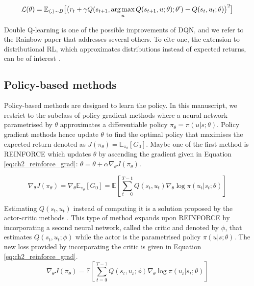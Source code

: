 \begin{equation}
    \label{eq:ch2_doubleQ}
    \mathcal{L}(\theta) = \mathbb{E}_{\langle . \rangle\sim B} \big[\big(r_{t} + \gamma Q(s_{t+1}, \operatorname*{arg\,max}_u Q(s_{t+1}, u;\theta) ; \theta')- Q(s_{t}, u_{t}; \theta)\big)^{2}\big]
\end{equation}

Double Q-learning is one of the possible improvements of DQN, and we refer to the Rainbow paper \citep{hessel2018rainbow} that addresses several others.
To cite one, the extension to distributional RL, which approximates distributions instead of expected returns, can be of interest \citep{bellemare2017distributional, THEATE2023199}. 

\subsection{Policy-based methods} \label{sec:ch2_policy_based_methods}
Policy-based methods are designed to learn the policy.
In this manuscript, we restrict to the subclass of policy gradient methods where a neural network parametrised by $\theta$ approximates a differentiable policy $\pi_\theta=\pi(u|s;\theta)$.
Policy gradient methods hence update $\theta$ to find the optimal policy that maximises the expected return denoted as  $J(\pi_\theta) = \mathbb{E}_{\pi_\theta}[G_0]$.
Maybe one of the first method is REINFORCE \citep{williams1992simple} which updates $\theta$  by ascending the gradient given in Equation \ref{eq:ch2_reinforce_grad}: $\theta = \theta + \alpha \nabla_\theta J(\pi_\theta)$.

\begin{equation}
\label{eq:ch2_reinforce_grad}
    \nabla_\theta J(\pi_\theta) = \nabla_\theta \mathbb{E}_{\pi_\theta}[G_0] = \mathbb{E}\left[\sum_{t=0}^{T-1} Q(s_t, u_t) \nabla_\theta \log \pi(u_t|s_t;\theta)\right]
\end{equation}

Estimating $Q(s_t, u_t)$ instead of computing it is a solution proposed by the actor-critic methods \citep{sutton1999policy,konda1999actor}.
This type of method expands upon REINFORCE by incorporating a second neural network, called the critic and denoted by $\phi$, that estimates $Q(s_t, u_t;\phi)$ while the actor is the parametrised policy $\pi(u|s;\theta)$.
The new loss provided by incorporating the critic is given in Equation \ref{eq:ch2_reinforce_grad}.
\begin{equation}
\label{eq:ch2_Q_actor_crit}
    \nabla_\theta J(\pi_\theta) = \mathbb{E}\left[\sum_{t=0}^{T-1} Q(s_t, u_t;\phi) \nabla_\theta \log \pi(u_t|s_t;\theta)\right]
\end{equation}

